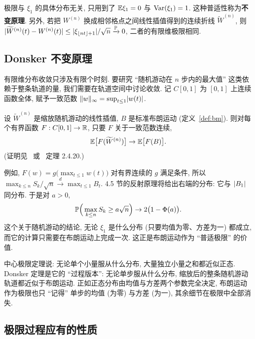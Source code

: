 \begin{remark}
极限与 $\xi_1$ 的具体分布无关, 只用到了 $\E\xi_1=0$ 与 $\Var(\xi_1)=1$. 这种普适性称为\textbf{不变原理}. 另外, 若把 $W^{(n)}$ 换成相邻格点之间线性插值得到的连续折线 $\widetilde{W}^{(n)}$, 则 $\abs{\widetilde{W}^{(n)}(t)-W^{(n)}(t)}\le\abs{\xi_{\lfloor nt\rfloor+1}}/\sqrt{n}\xrightarrow{\P}0$, 二者的有限维极限相同.
\end{remark}

\subsection{Donsker 不变原理}

有限维分布收敛只涉及有限个时刻. 要研究 ``随机游动在 $n$ 步内的最大值'' 这类依赖于整条轨道的量, 我们需要在轨道空间中讨论收敛. 记 $C[0,1]$ 为 $[0,1]$ 上连续函数全体, 赋予一致范数 $\norm{w}_\infty=\sup_{t\le1}\abs{w(t)}$.

\begin{theorem}\label{thm:donsker}
设 $\widetilde{W}^{(n)}$ 是缩放随机游动的线性插值, $B$ 是标准布朗运动 (定义~\ref{def:bm}). 则对每个有界函数 $F:C[0,1]\to\R$, 只要 $F$ 关于一致范数连续,
\[
\E\big[F(\widetilde{W}^{(n)})\big]\to\E\big[F(B)\big].
\]
(证明见~\cite{billingsley} 或~\cite{karatzas} 定理 2.4.20.)
\end{theorem}

例如, $F(w)=g\big(\max_{t\le1}w(t)\big)$ 对有界连续的 $g$ 满足条件, 所以 $\max_{k\le n}S_k/\sqrt{n}\xrightarrow{d}\max_{t\le1}B_t$. 4.5 节的反射原理将给出右端的分布: 它与 $\abs{B_1}$ 同分布. 于是对 $a>0$,
\[
\P\Big(\max_{k\le n}S_k\ge a\sqrt{n}\Big)\to2\big(1-\Phi(a)\big).
\]
这个关于随机游动的结论, 无论 $\xi_1$ 是什么分布 (只要均值为零、方差为一) 都成立, 而它的计算只需要在布朗运动上完成一次. 这正是布朗运动作为 ``普适极限'' 的价值.

\begin{intuition}
中心极限定理说: 无论单个小量服从什么分布, 大量独立小量之和都近似正态. Donsker 定理是它的 ``过程版本'': 无论单步服从什么分布, 缩放后的整条随机游动轨道都近似于布朗运动. 正如正态分布由均值与方差两个参数完全决定, 布朗运动作为极限也只 ``记得'' 单步的均值 (为零) 与方差 (为一), 其余细节在极限中全部消失.
\end{intuition}

\subsection{极限过程应有的性质}


